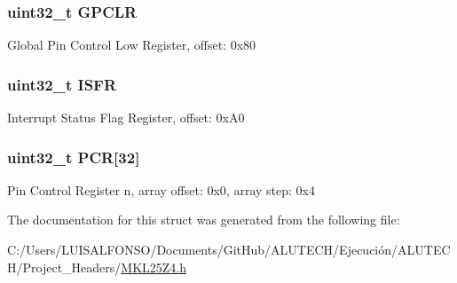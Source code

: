 \subsubsection[{G\+P\+C\+L\+R}]{\setlength{\rightskip}{0pt plus 5cm}uint32\+\_\+t G\+P\+C\+L\+R}\label{struct_p_o_r_t___mem_map_a6e7a9e797813e20f3c1719d92158e1c9}
Global Pin Control Low Register, offset\+: 0x80 \hypertarget{struct_p_o_r_t___mem_map_a5c88289be439e694726a8c11ae0059fc}{}
\subsubsection[{I\+S\+F\+R}]{\setlength{\rightskip}{0pt plus 5cm}uint32\+\_\+t I\+S\+F\+R}\label{struct_p_o_r_t___mem_map_a5c88289be439e694726a8c11ae0059fc}
Interrupt Status Flag Register, offset\+: 0x\+A0 \hypertarget{struct_p_o_r_t___mem_map_ad806aad894fe96382a78c6119527d0e8}{}
\subsubsection[{P\+C\+R}]{\setlength{\rightskip}{0pt plus 5cm}uint32\+\_\+t P\+C\+R\mbox{[}32\mbox{]}}\label{struct_p_o_r_t___mem_map_ad806aad894fe96382a78c6119527d0e8}
Pin Control Register n, array offset\+: 0x0, array step\+: 0x4 

The documentation for this struct was generated from the following file\+:\begin{DoxyCompactItemize}
\item 
C\+:/\+Users/\+L\+U\+I\+S\+A\+L\+F\+O\+N\+S\+O/\+Documents/\+Git\+Hub/\+A\+L\+U\+T\+E\+C\+H/\+Ejecución/\+A\+L\+U\+T\+E\+C\+H/\+Project\+\_\+\+Headers/\hyperlink{_m_k_l25_z4_8h}{M\+K\+L25\+Z4.\+h}\end{DoxyCompactItemize}
